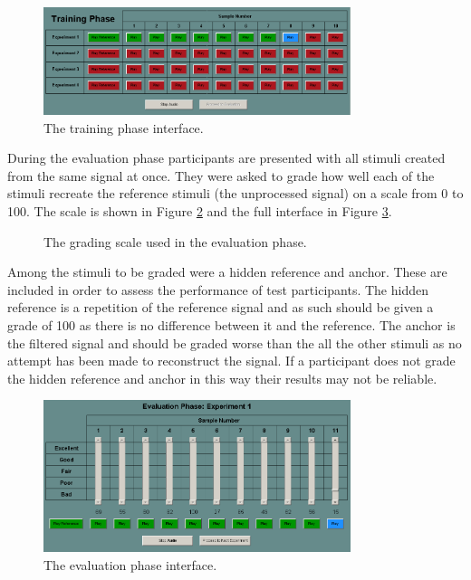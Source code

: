 			\begin{figure}[h!]
				\centering
				\includegraphics[width=0.8\textwidth]{chapter7/Images/MushraTraining.png}
				\caption{The training phase interface.}
				\label{fig:MushraTraining}
			\end{figure}

			During the evaluation phase participants are presented with all stimuli created from the same signal
			at once. They were asked to grade how well each of the stimuli recreate the reference stimuli (the
			unprocessed signal) on a scale from 0 to 100. The scale is shown in Figure \ref{fig:MushraScale} and
			the full interface in Figure \ref{fig:MushraEvaluation}.

			\begin{figure}[h!]
				\centering
				\caption{The grading scale used in the evaluation phase.}
				\label{fig:MushraScale}
			\end{figure}

			Among the stimuli to be graded were a hidden reference and anchor. These are included in order to
			assess the performance of test participants. The hidden reference is a repetition of the reference
			signal and as such should be given a grade of 100 as there is no difference between it and the
			reference. The anchor is the filtered signal and should be graded worse than the all the other
			stimuli as no attempt has been made to reconstruct the signal. If a participant does not grade the
			hidden reference and anchor in this way their results may not be reliable.

			\begin{figure}[h!]
				\centering
				\includegraphics[width=0.8\textwidth]{chapter7/Images/MushraEvaluation.png}
				\caption{The evaluation phase interface.}
				\label{fig:MushraEvaluation}
			\end{figure}

